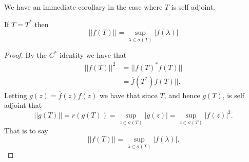 \documentclass{unswmaths}
\begin{document}
We have an immediate corollary in the case where $ T $ is self adjoint.

\begin{corollary}
	If $ T = T^* $ then $$||f(T)|| = \sup_{\lambda \in \sigma(T)} |f(\lambda)|$$
\end{corollary}
\begin{proof}
	By the $ C^* $ identity we have that
	\begin{align*}
		||f(T)||^2 &= ||f(T)^*f(T)|| \\
			&= \overline{f}(T^*)f(T) ||.
	\end{align*}
	Letting $ g(z) = \overline{f}(z)f(z) $ we have that since $ T $, and hence $ g(T) $, is self adjoint that  
	$$
		||g(T)|| = r(g(T)) = \sup_{z \in \sigma(T)} |g(z)| = \sup_{z \in \sigma(T)} |f(z)|^2.
	$$
	That is to say $$||f(T)|| = \sup_{\lambda \in \sigma(T)} |f(\lambda)|.$$
\end{proof}
\end{document}
